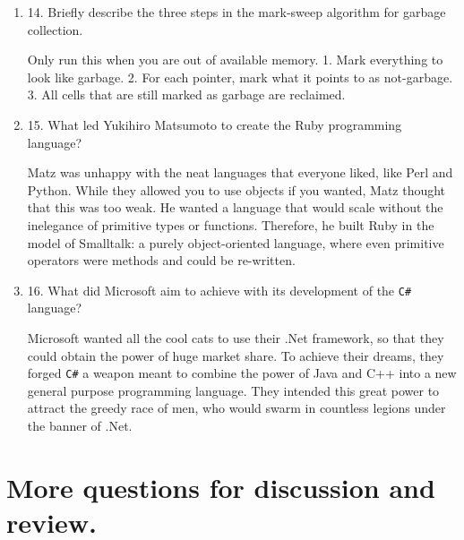 \begin{enumerate}
\begin{answer}
    \end{answer}

  \item 14. Briefly describe the three steps in the mark-sweep algorithm
    for garbage collection.

  \begin{answer}

    Only run this when you are out of available memory.
    1. Mark everything to look like garbage.
    2. For each pointer, mark what it points to as not-garbage.
    3. All cells that are still marked as garbage are reclaimed. 

    \end{answer}

  \item 15. What led Yukihiro Matsumoto to create the Ruby programming language?

  \begin{answer}

    Matz was unhappy with the neat languages that everyone liked, like
    Perl and Python. While they allowed you to use objects if you
    wanted, Matz thought that this was too weak. He wanted a language
    that would scale without the inelegance of primitive types or
    functions. Therefore, he built Ruby in the model of Smalltalk: a
    purely object-oriented language, where even primitive operators
    were methods and could be re-written.

    \end{answer}

  \item 16. What did Microsoft aim to achieve with its development of the
    \verb+C#+ language?

  \begin{answer}

    Microsoft wanted all the cool cats to use their .Net framework, so
    that they could obtain the power of huge market share. To achieve
    their dreams, they forged \verb+C#+ a weapon meant to combine the
    power of Java and C++ into a new general purpose programming
    language. They intended this great power to attract the greedy
    race of men, who would swarm in countless legions under the banner
    of .Net.

    \end{answer}

  \end{enumerate}



\section{More questions for discussion and review.}

